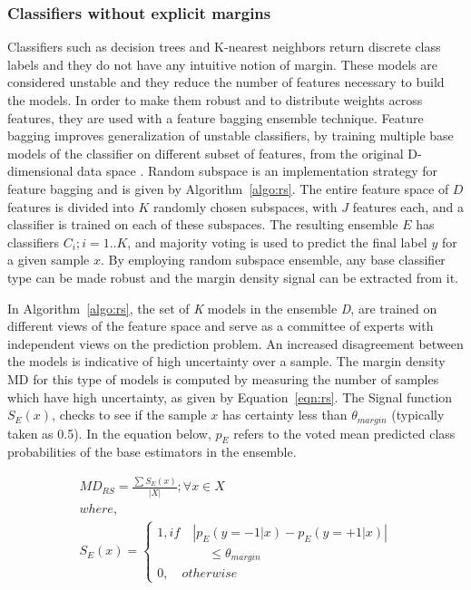 \documentclass[authoryear,3p,times,twocolumn]{elsarticle}
\begin{document}
\subsubsection{Classifiers without explicit margins}
\label{sec:computing_rs}

Classifiers such as decision trees \citep{quinlan1993c4} and K-nearest neighbors \citep{cover1967nearest} return discrete class labels and they do not have any intuitive notion of margin. These models are considered unstable \citep{dietterich2000ensemble} and they reduce the number of features necessary to build the models. In order to make them robust and to distribute weights across features, they are used with a feature bagging ensemble technique. Feature bagging improves generalization of unstable classifiers, by training multiple base models of the classifier on different subset of features, from the original D-dimensional data space \citep{bry}. Random subspace \citep{ahn2007classification,skurichina2002bagging} is an implementation strategy for feature bagging and is given by Algorithm~\ref{algo:rs}. The entire feature space of $D$ features is divided into $K$ randomly chosen subspaces, with $J$ features each, and a classifier is trained on each of these subspaces. The resulting ensemble $E$ has classifiers $C_{i}; i=1..K$, and majority voting is used to predict the final label $y$ for a given sample $x$. By employing random subspace ensemble, any base classifier type can be made robust and the margin density signal can be extracted from it.

In Algorithm~\ref{algo:rs}, the set of \textit{K} models in the ensemble \textit{D}, are trained on different views of the feature space and serve as a committee of experts with independent views on the prediction problem. An increased disagreement between the models is indicative of high uncertainty over a sample. The margin density MD for this type of models is computed by measuring the number of samples which have high uncertainty, as given by Equation~\ref{eqn:rs}. The Signal function $S_E(x)$, checks to see if the sample $x$ has certainty less than $\theta_{margin}$ (typically taken as 0.5). In the equation below, $p_E$ refers to the voted mean predicted class probabilities of the base estimators in the ensemble. 

\begin{equation}
\begin{aligned}
{ MD }_{ RS }=\frac { \sum { { S }_{ E }(x) }  }{ \left| X \right|}; \forall x\in X \\
where,\\
{ S }_{ E }(x)=\begin{cases} 1, if \quad \left| { p }_{ E }({ y= -1 }|x)-{ p }_{ E }({ y= +1 }|x) \right| \\ 
\quad\quad\quad\quad \le { \theta  }_{ margin } \\ 0, \quad otherwise \end{cases}
\end{aligned}
\label{eqn:rs}
\end{equation}
\end{document}
